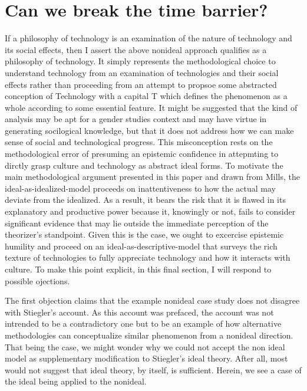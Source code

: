 \documentclass[letterpaper,notitlepage,12pt]{article}
\begin{document}


\section{Can we break the time barrier?}

If a philosophy of technology is an examination of the nature of technology and
its social effects, then I assert the above nonideal approach qualifies as a
philosophy of technology.
It simply represents the methodological choice to understand technology from an
examination of technologies and their social effects rather than proceeding from
an attempt to propsoe some abstracted conception of Technology with a capital T
which defines the phenomenon as a whole according to some essential feature.
It might be suggested that the kind of analysis may be apt for a gender studies
context and may have virtue in generating socilogical knowledge, but that it
does not address how we can make sense of social and technological progress.
This misconception rests on the methodological error of presuming an epistemic
confidence in attepmting to dirctly grasp culture and technology as abstract
ideal forms.
To motivate the main methodological argument presented in this paper and drawn
from Mills, the ideal-as-idealized-model proceeds on inattentiveness to how the
actual may deviate from the idealized.
As a result, it bears the risk that it is flawed in its explanatory and
productive power because it, knowingly or not, fails to consider significant
evidence that may lie outside the immediate perception of the theorizer's
standpoint.
Given this is the case, we ought to excercise epistemic humility and proceed on
an ideal-as-descriptive-model that surveys the rich texture of technologies to
fully appreciate technology and how it interacts with culture.
To make this point explicit, in this final section, I will respond to possible
ojections.

The first objection claims that the example nonideal case study does not
disagree with Stiegler's account.
As this account was prefaced, the account was not intrended to be a
contradictory one but to be an example of how alternative methodologies can
conceptualize similar phenomenon from a nonideal direction.
That being the case, we might wonder why we could not accept the non ideal model
as supplementary modification to Stiegler's ideal theory.
After all, most would not suggest that ideal theory, by itself, is sufficient.
Herein, we see a case of the ideal being applied to the nonideal.
\end{document}
